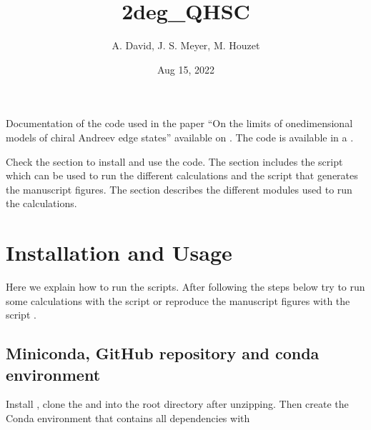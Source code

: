 \documentclass[letterpaper,10pt,english]{sphinxmanual}
\title{2deg\_QH\sphinxhyphen{}SC}
\date{Aug 15, 2022}
\author{A.\@{} David, J.\@{} S.\@{} Meyer, M.\@{} Houzet}
\begin{document}
\pagestyle{empty}
\sphinxmaketitle
\pagestyle{plain}
\sphinxtableofcontents
\pagestyle{normal}
\label{\detokenize{index::doc}}


\sphinxAtStartPar
Documentation of the code used in the paper “On the limits of one\sphinxhyphen{}dimensional models of chiral Andreev edge states” available on . The code is available in a .

\sphinxAtStartPar
Check the {\hyperref[\detokenize{usage::doc}]{}} section to install and use the code. The {\hyperref[\detokenize{main_scripts::doc}]{}} section includes the script  which can be used to run the different calculations and the script  that generates the manuscript figures. The {\hyperref[\detokenize{modules::doc}]{}} section describes the different modules used to run the calculations.

\sphinxstepscope


\chapter{Installation and Usage}
\label{\detokenize{usage:installation-and-usage}}\label{\detokenize{usage::doc}}
\sphinxAtStartPar
Here we explain how to run the scripts.
After following the steps below try to run some calculations
with the script  or reproduce the manuscript
figures with the script .


\section{Miniconda, GitHub repository and conda environment}
\label{\detokenize{usage:miniconda-github-repository-and-conda-environment}}
\sphinxAtStartPar
Install 
, clone the 
and  into the root directory  after unzipping.
Then create the Conda environment that contains all dependencies with

\begin{sphinxVerbatim}[commandchars=\\\{\}]
    
\end{sphinxVerbatim}
\end{document}
